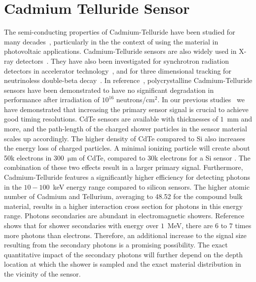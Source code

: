 %
%
%
\section{Cadmium Telluride Sensor}
\label{sec:siliconpad}
The semi-conducting properties of Cadmium-Telluride have been studied for many decades~\cite{cdtegeneric}, 
particularly in the the context of using the material in photovoltaic applications.
Cadmium-Telluride sensors are also widely used in X-ray detectors~\cite{cdtesensorsgeneric,cdtesensors2,cdtesensors3}. 
They have also been investigated for synchrotron radiation detectors in accelerator 
technology~\cite{cdtelhc}, and for three dimensional tracking for neutrinoless 
double-beta decay~\cite{Filipenko:2014zta}. In reference~\cite{cdtelhc}, polycrystalline 
Cadmium-Telluride sensors have been demonstrated to have no significant degradation in
performance after irradiation of $10^{16}$ neutrons/$\mathrm{cm}^{2}$. In our previous 
studies~\cite{Anderson:2015gha,MCPShowerMaxPaper,Ronzhin201552,SiliconTiming,PixelatedMCP,Anderson:2016ygg,Anderson:2015tia} 
we have demonstrated that increasing the primary sensor signal is crucial to achieve good timing resolutions.  
CdTe sensors are available with thicknesses of $1$~mm and more, and the path-length of the charged 
shower particles in the sensor material scales up accordingly. The higher density of CdTe compared 
to Si also increases the energy loss of charged particles. 
A minimal ionizing particle will create about 50k electrons in 300~$\mathrm{\mu}$m 
of CdTe, compared to 30k electrons for a Si sensor \cite{cdtelhc2}.  The combination of these
two effects result in a larger primary signal. Furthermore, Cadmium-Telluride features 
a significantly higher efficiency for detecting photons in the $10-100$~keV energy range 
compared to silicon sensors. The higher atomic number of Cadmium and Tellurium, averaging 
to 48.52 for the compound bulk material, results in a higher interaction cross section for 
photons in this energy range. Photons secondaries are abundant in electromagnetic showers. 
Reference~\cite{Beringer:1900zz} shows that for shower secondaries with energy over 
$1$~MeV, there are $6$ to $7$ times more photons than electrons. Therefore, an 
additional increase to the signal size resulting from the secondary photons is a promising 
possibility. The exact quantitative impact of the secondary photons will further depend 
on the depth location at which the shower is sampled and the exact material distribution 
in the vicinity of the sensor. 

